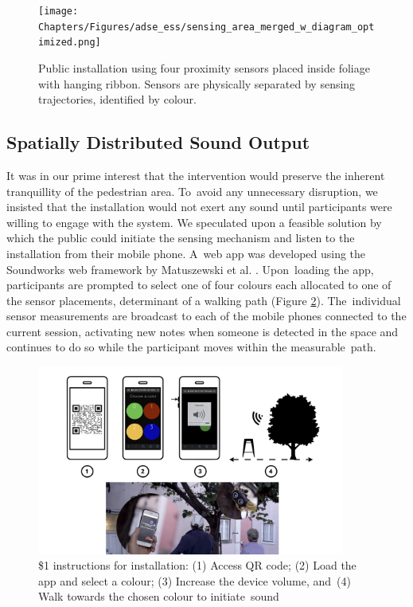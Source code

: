 \begin{figure}
\texttt{[image: Chapters/Figures/adse\_ess/sensing\_area\_merged\_w\_diagram\_optimized.png]}
{\caption{Public installation using four proximity sensors placed inside foliage with hanging ribbon. Sensors are physically separated by sensing trajectories, identified by colour.}
\label{fig:installation_sensor_setup}
}
\end{figure}

\subsection*{Spatially Distributed Sound Output}

It was in our prime interest that the intervention would preserve the inherent tranquillity of the pedestrian area. To~avoid any unnecessary disruption, we insisted that the installation would not exert any sound until participants were willing to engage with the system. We speculated upon a feasible solution by which the public could initiate the sensing mechanism and listen to the installation from their mobile phone. A~web app was developed using the
Soundworks web framework by  Matuszewski et al. %
\cite{matuszewski_interaction_2019}. Upon~loading the app, participants are prompted to select one of four colours each allocated to one of the sensor placements, determinant of a walking path (Figure \ref{fig:installation_instructions}). The~individual sensor measurements are broadcast to each of the mobile phones connected to the current session, activating new notes when someone is detected in the space and continues to do so while the participant moves within the measurable~path.

\vspace{-6pt}
\begin{figure}
\includegraphics[width=0.9\textwidth,keepaspectratio]{Chapters/Figures/adse_ess/ADSE-WP-INSTRUCTIONS_2.png}
{\caption{\$1 %
 instructions for installation: (1) Access QR code; (2) Load the app and select a colour; (3) Increase the device volume, and~(4) Walk towards the chosen colour to initiate~sound}
\label{fig:installation_instructions}}
\end{figure}

